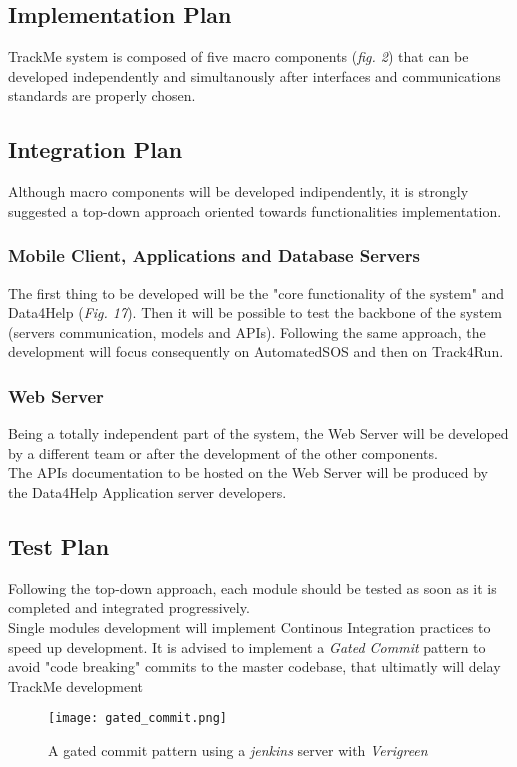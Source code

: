 \documentclass[../main.tex]{subfiles}
\begin{document}
\subsection{Implementation Plan}
TrackMe system is composed of five macro components (\textit{fig. 2}) that can be developed independently and simultanously
after interfaces and communications standards are properly chosen.\\



\subsection{Integration Plan}
Although macro components will be developed indipendently, it is strongly suggested a top-down approach oriented towards functionalities
implementation. 
 \subsubsection{Mobile Client, Applications and Database Servers}
    The first thing to be developed will be the "core functionality of the system" and Data4Help (\textit{Fig. 17}). Then it will be possible
    to test the backbone of the system (servers communication, models and APIs). Following the same approach, the development will focus consequently on
    AutomatedSOS and then on Track4Run.

    
 \subsubsection{Web Server}
    Being a totally independent part of the system, the Web Server will be developed by a different team or after the development of the other components.\\
    The APIs documentation to be hosted on the Web Server will be produced by the Data4Help Application server developers. 
\subsection{Test Plan}
    Following the top-down approach, each module should be tested as soon as it is completed and integrated progressively.\\
    Single modules development will implement Continous Integration practices to speed up development.
    It is advised to implement a \textit{Gated Commit} pattern to avoid "code breaking" commits to the master codebase, that ultimatly will delay
    TrackMe development 
    \begin{figure}[H]
        \centering
             \texttt{[image: gated\_commit.png]}
              \caption{A gated commit pattern using a \textit{jenkins} server with \textit{Verigreen}}
               \label{fig:gated_commit}
    \end{figure}
\end{document}
